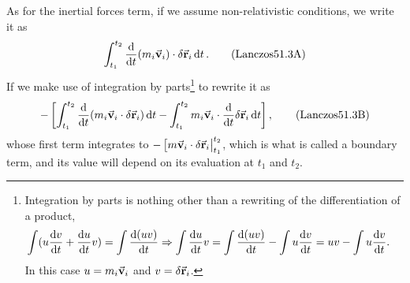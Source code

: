 \documentclass[12pt, english, a4paper]{article}
\begin{document}
As for the inertial forces term, if we assume non-relativistic conditions, we write it as 
\begin{equation}\label{Lanczos51.3A}
	\int^{t_2}_{t_1} \dv{t} \pqty{m_i \va{v}_i} \cdot \delta \va{r}_i \dd{t}.
	\tag{Lanczos51.3A}
\end{equation} 
If we make use of integration by parts\footnote{\label{integraciónPartes}Integration by parts is nothing other than a rewriting of the differentiation of a product, 
\begin{align}
	\int (u \dv{v}{t}+ \dv{u}{t} v) & = \int \dv{(u v)}{t} \Rightarrow
	\int \dv{u}{t} v = \int \dv{(u v)}{t} - \int u \dv{v}{t}
	=
	u v - \int u \dv{v}{t}
	.
\end{align}
In this case \(u= m_i \va{v}_i\) and \(v= \delta \va{r}_i\).
} to rewrite it as
\begin{equation}\label{Lanczos51.3B}
- \left[ \int^{t_2}_{t_1} \dv{t} \pqty{ m_i \va{v}_i  \cdot \delta \va{r}_i } \dd{t} - \int^{t_2}_{t_1} m_i \va{v}_i \cdot \dv{t} \delta \va{r}_i \dd{t} \right],
	\tag{Lanczos51.3B}
\end{equation}
whose first term integrates to \(- \eval[ m \va{v}_i \cdot \delta \va{r}_i |^{t_2}_{t_1}\), which is what is called a boundary term, and its value will depend on its evaluation at \(t_1\) and \(t_2\).
\end{document}

